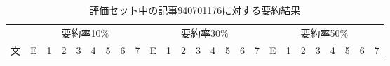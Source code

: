 \begin{table*}
\begin{center}
\caption{評価セット中の記事940701176に対する要約結果}
{\scriptsize
\begin{tabular}{|c||c||c|c|c|c|c|c|c||c||c|c|c|c|c|c|c||c||c|c|c|c|c|c|c|} \hline
 & \multicolumn{8}{c|}{要約率10\%} & \multicolumn{8}{c|}{要約率30\%} & \multicolumn{8}{c|}{要約率50\%} \\ \cline{2-25}
文 & \hspace{-1.0pt}E\hspace{-1.0pt} & \hspace{-1.0pt}1\hspace{-1.0pt} & \hspace{-1.0pt}2\hspace{-1.0pt} & \hspace{-1.0pt}3\hspace{-1.0pt} & \hspace{-1.0pt}4\hspace{-1.0pt} & \hspace{-1.0pt}5\hspace{-1.0pt} & \hspace{-1.0pt}6\hspace{-1.0pt} & \hspace{-1.0pt}7\hspace{-1.0pt} & \hspace{-1.0pt}E\hspace{-1.0pt} & \hspace{-1.0pt}1\hspace{-1.0pt} & \hspace{-1.0pt}2\hspace{-1.0pt} & \hspace{-1.0pt}3\hspace{-1.0pt} & \hspace{-1.0pt}4\hspace{-1.0pt} & \hspace{-1.0pt}5\hspace{-1.0pt} & \hspace{-1.0pt}6\hspace{-1.0pt} & \hspace{-1.0pt}7\hspace{-1.0pt} & \hspace{-1.0pt}E\hspace{-1.0pt} & \hspace{-1.0pt}1\hspace{-1.0pt} & \hspace{-1.0pt}2\hspace{-1.0pt} & \hspace{-1.0pt}3\hspace{-1.0pt} & \hspace{-1.0pt}4\hspace{-1.0pt} & \hspace{-1.0pt}5\hspace{-1.0pt} & \hspace{-1.0pt}6\hspace{-1.0pt} & \hspace{-1.0pt}7\hspace{-1.0pt} \\ \hline\hline

\end{tabular}}
\end{center}
\end{table*}
